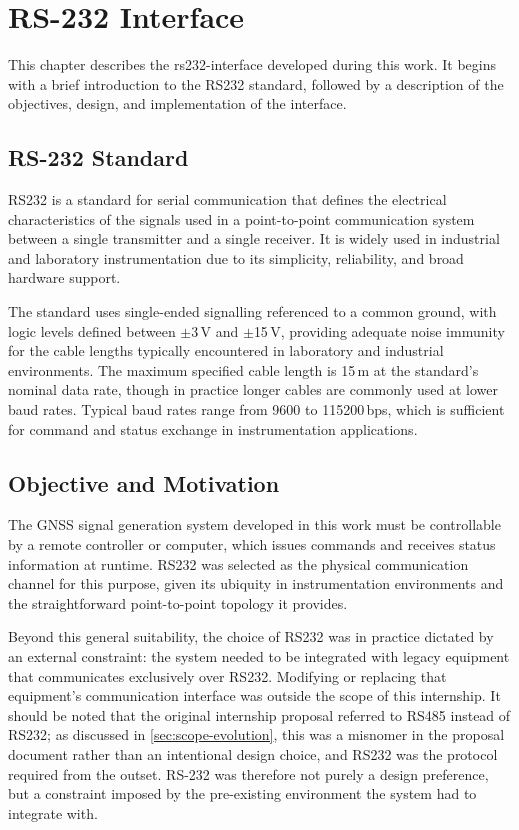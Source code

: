 %
\chapter{RS-232 Interface}
\label{cha:rs232-interface}

This chapter describes the \gls{rs232-interface} developed during this work. It
begins with a brief introduction to the \gls{RS232} standard, followed by a
description of the objectives, design, and implementation of the interface.

\section{RS-232 Standard}

\gls{RS232} is a standard for serial communication that defines the electrical
characteristics of the signals used in a point-to-point communication system
between a single transmitter and a single receiver. It is widely used in
industrial and laboratory instrumentation due to its simplicity, reliability,
and broad hardware support.\cite{wikipediaRS232}

The standard uses single-ended signalling referenced to a common ground, with
logic levels defined between $\pm$3\,V and $\pm$15\,V, providing adequate noise
immunity for the cable lengths typically encountered in laboratory and
industrial environments. The maximum specified cable length is 15\,m at the
standard's nominal data rate, though in practice longer cables are commonly
used at lower baud rates. Typical baud rates range from 9600 to 115200\,bps,
which is sufficient for command and status exchange in instrumentation
applications.

\section{Objective and Motivation}

The \gls{GNSS} signal generation system developed in this work must be
controllable by a remote controller or computer, which issues commands and
receives status information at runtime. \gls{RS232} was selected as the
physical communication channel for this purpose, given its ubiquity in
instrumentation environments and the straightforward point-to-point topology it
provides.

Beyond this general suitability, the choice of \gls{RS232} was in practice
dictated by an external constraint: the system needed to be integrated with
legacy equipment that communicates exclusively over \gls{RS232}. Modifying or
replacing that equipment's communication interface was outside the scope of
this internship. It should be noted that the original internship proposal
referred to \gls{RS485} instead of \gls{RS232}; as discussed in
\autoref{sec:scope-evolution}, this was a misnomer in the proposal document
rather than an intentional design choice, and \gls{RS232} was the protocol
required from the outset. RS-232 was therefore not purely a design preference,
but a constraint imposed by the pre-existing environment the system had to
integrate with.

